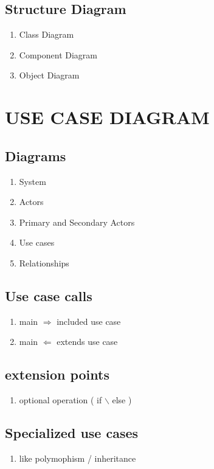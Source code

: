 \documentclass[11pt]{article}
\begin{document}
\subsection{Structure Diagram}
\label{sec:org05f5ce9}
\begin{enumerate}
\item Class Diagram
\label{sec:orgfe40575}
\item Component Diagram
\label{sec:orgc4135b2}
\item Object Diagram
\label{sec:orgdf742e2}
\vspace*{0.5cm}
\end{enumerate}

\section{USE CASE DIAGRAM}
\label{sec:org8495ea8}
\subsection{Diagrams}
\label{sec:org9ad1601}
\begin{enumerate}
\item System
\label{sec:orgaea35e2}
\item Actors
\label{sec:org8b1faf7}
\item Primary and Secondary Actors
\label{sec:orgc3379dc}
\item Use cases
\label{sec:org810ff33}
\item Relationships
\label{sec:org38f3c70}
\end{enumerate}
\subsection{Use case calls}
\label{sec:org1b85dd9}
\begin{enumerate}
\item main \(\Rightarrow\) included use case
\label{sec:org36fa5a2}
\item main \(\Leftarrow\) extends use case
\label{sec:org627de36}
\end{enumerate}
\subsection{extension points}
\label{sec:orgd9e3100}
\begin{enumerate}
\item optional operation ( if $\backslash$ else )
\label{sec:org3e1cd6b}
\end{enumerate}

\subsection{Specialized use cases}
\label{sec:org623795a}
\begin{enumerate}
\item like polymophism / inheritance
\label{sec:orgf023a1f}
\end{enumerate}
\end{document}
